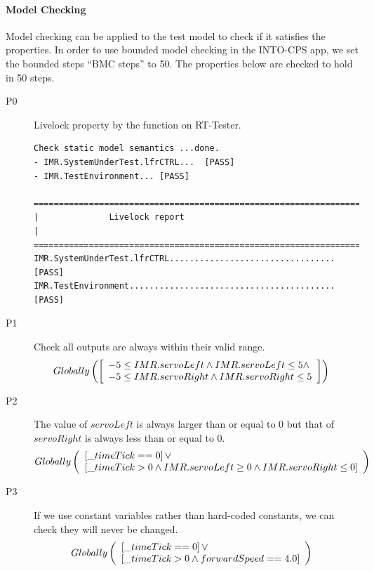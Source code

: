 \paragraph{Model Checking}
Model checking can be applied to the test model to check if it satisfies the properties. In order to use bounded model checking in the INTO-CPS app, we set the bounded steps ``BMC steps'' to 50. The properties below are checked to hold in 50 steps.

\begin{description}
    \item[P0] Livelock property by the  function on RT-Tester.
\begin{verbatim}
Check static model semantics ...done.
- IMR.SystemUnderTest.lfrCTRL...  [PASS]
- IMR.TestEnvironment... [PASS]

=================================================================
|              Livelock report                                  |
=================================================================
IMR.SystemUnderTest.lfrCTRL.................................[PASS]
IMR.TestEnvironment.........................................[PASS]
\end{verbatim}

    \item[P1] Check all outputs are always within their valid range.
\begin{align*}
    & Globally \left(\left[
        \begin{array}[]{l}
        -5 \leq IMR.servoLeft \land IMR.servoLeft \leq 5 \land \\
        -5 \leq IMR.servoRight \land IMR.servoRight \leq 5
        \end{array}
        \right]\right) &
\end{align*}
    \item[P2] The value of $servoLeft$ is always larger than or equal to 0 but that of $servoRight$ is always less than or equal to 0. 
\begin{align*}
    & Globally \left(
        \begin{array}[]{l}
            \left[\_timeTick == 0\right] \lor \\
            \left[\_timeTick > 0 \land IMR.servoLeft \geq 0 \land IMR.servoRight \leq 0 \right]
        \end{array}
    \right) &
\end{align*}
    \item[P3] If we use constant variables rather than hard-coded constants, we can check they will never be changed. 
\begin{align*}
    & Globally \left(
        \begin{array}[]{l}
            \left[\_timeTick == 0\right] \lor \\
            \left[\_timeTick > 0 \land forwardSpeed == 4.0\right]
        \end{array}
    \right) &
\end{align*}
\end{description}

